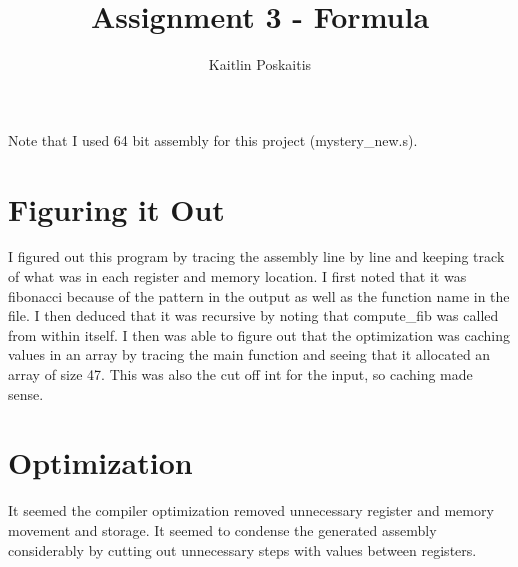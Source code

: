 \documentclass[11pt]{article}
\title{\bf Assignment 3 - Formula}
\author{Kaitlin Poskaitis}
\date{}
\begin{document}
\maketitle

Note that I used 64 bit assembly for this project (mystery\_new.s).

\section*{Figuring it Out}

I figured out this program by tracing the assembly line by line and keeping 
track of what was in each register and memory location. I first noted that it
was fibonacci because of the pattern in the output as well as the function name
in the file. I then deduced that it was recursive by noting that compute\_fib 
was called from within itself.  I then was able to figure out that the 
optimization was caching values in an array by tracing the main function and 
seeing that it allocated an array of size 47. This was also the cut off int
for the input, so caching made sense.

\section*{Optimization}

It seemed the compiler optimization removed unnecessary register and memory 
movement and storage. It seemed to condense the generated assembly considerably
by cutting out unnecessary steps with values between registers.
\end{document}
